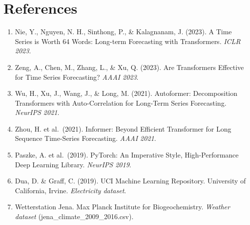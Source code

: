 \documentclass[11pt]{article}
\begin{document}
\section*{References}
\begin{enumerate}[leftmargin=1.5em, topsep=2pt, itemsep=1pt]
  \item Nie, Y., Nguyen, N. H., Sinthong, P., \& Kalagnanam, J. (2023). A Time Series is Worth 64 Words: Long-term Forecasting with Transformers. \textit{ICLR 2023}.
  \item Zeng, A., Chen, M., Zhang, L., \& Xu, Q. (2023). Are Transformers Effective for Time Series Forecasting? \textit{AAAI 2023}.
  \item Wu, H., Xu, J., Wang, J., \& Long, M. (2021). Autoformer: Decomposition Transformers with Auto-Correlation for Long-Term Series Forecasting. \textit{NeurIPS 2021}.
  \item Zhou, H. et al.\ (2021). Informer: Beyond Efficient Transformer for Long Sequence Time-Series Forecasting. \textit{AAAI 2021}.
  \item Paszke, A. et al.\ (2019). PyTorch: An Imperative Style, High-Performance Deep Learning Library. \textit{NeurIPS 2019}.
  \item Dua, D. \& Graff, C. (2019). UCI Machine Learning Repository. University of California, Irvine. \textit{Electricity dataset}.
  \item Wetterstation Jena. Max Planck Institute for Biogeochemistry. \textit{Weather dataset} (jena\_climate\_2009\_2016.csv).
\end{enumerate}
\end{document}

